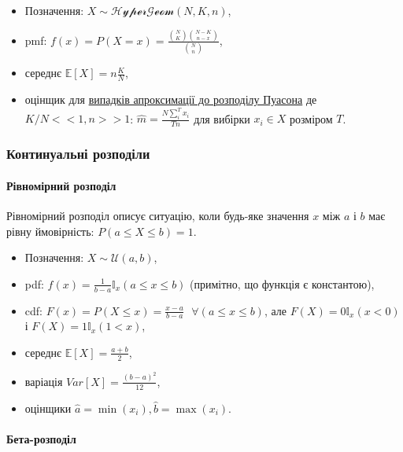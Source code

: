 \documentclass[
  11pt,
]{book}
\begin{document}
\begin{itemize}
\item
  Позначення: \(X \sim \mathcal{HyperGeom}(N, K, n)\),
\item
  pmf:
  \(f(x) = P(X = x) = \frac{\binom{N}{K} \binom{N-K}{n - x}}{\binom{N}{n}}\),
\item
  середнє \(\mathbb{E} [X] = n \frac{K}{N}\),
\item
  оцінщик для
  \href{https://math.stackexchange.com/questions/40319/maximum-likelihood-estimate-of-hypergeometric-distribution-parameter}{випадків
  апроксимації до розподілу Пуасона} де \(K/N << 1, n >> 1\):
  \(\hat{m} = \frac{N \sum \limits_i^T x_i}{Tn}\) для вибірки
  \(x_i \in X\) розміром \(T\).
\end{itemize}

\subsubsection{Континуальні
розподіли}\label{ux43aux43eux43dux442ux438ux43dux443ux430ux43bux44cux43dux456-ux440ux43eux437ux43fux43eux434ux456ux43bux438}

\paragraph{Рівномірний
розподіл}\label{ux440ux456ux432ux43dux43eux43cux456ux440ux43dux438ux439-ux440ux43eux437ux43fux43eux434ux456ux43b}

Рівномірний розподіл описує ситуацію, коли будь-яке значення \(x\) між
\(a\) і \(b\) має рівну ймовірність: \(P(a \leq X \leq b) = 1\).

\begin{itemize}
\item
  Позначення: \(X \sim \mathcal{U}(a, b)\),
\item
  pdf: \(f(x) = \frac{1}{b-a} \mathbb{I}_x (a \leq x \leq b)\)
  (примітно, що функція є константою),
\item
  cdf:
  \(F(x) = P(X \leq x) = \frac{x-a}{b-a} \text { } \forall (a \leq x \leq b)\),
  але \(F(X) = 0 \mathbb{I}_x(x < 0)\) і
  \(F(X) = 1 \mathbb{I}_x (1 < x)\),
\item
  середнє \(\mathbb{E} [X] = \frac{a+b}{2}\),
\item
  варіація \(Var[X] = \frac{(b-a)^2}{12}\),
\item
  оцінщики \(\hat{a} = \min(x_i), \hat{b} = \max(x_i)\).
\end{itemize}

\paragraph{Бета-розподіл}\label{ux431ux435ux442ux430-ux440ux43eux437ux43fux43eux434ux456ux43b}
\end{document}
